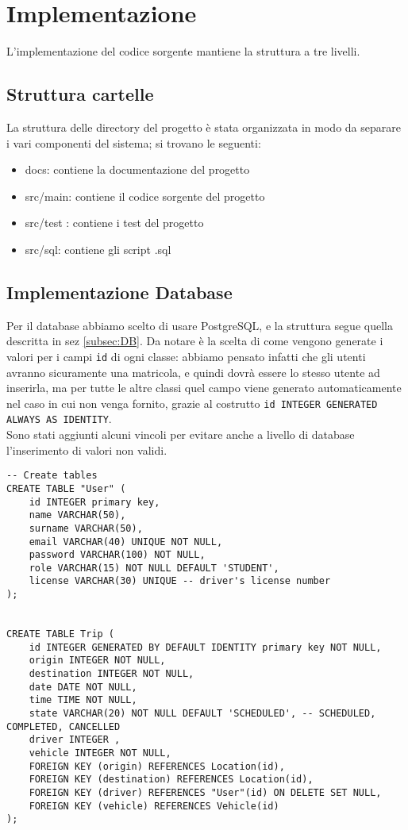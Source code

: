 \section{Implementazione}

L'implementazione del codice sorgente mantiene la struttura a tre livelli.
\subsection{Struttura cartelle}
La struttura delle directory del progetto è stata organizzata in modo da separare i vari componenti del sistema; si trovano le seguenti:
\begin{itemize}
    \item docs: contiene la documentazione del progetto
    \item src/main: contiene il codice sorgente del progetto
    \item src/test : contiene i test del progetto
    \item src/sql: contiene gli script .sql
\end{itemize}

\subsection{Implementazione Database}\label{subsec:DBimpl}
Per il database abbiamo scelto di usare PostgreSQL, e la struttura segue quella descritta in sez \ref{subsec:DB}.
Da notare è la scelta di come vengono generate i valori per i campi \texttt{id} di ogni classe: abbiamo pensato infatti che gli utenti avranno sicuramente una matricola, e quindi dovrà essere lo stesso utente ad inserirla, ma per tutte le altre classi quel campo viene generato automaticamente nel caso in cui non venga fornito, grazie al costrutto \texttt{id INTEGER GENERATED ALWAYS AS IDENTITY}.\\
Sono stati aggiunti alcuni vincoli per evitare anche a livello di database l'inserimento di valori non validi.

\begin{lstlisting}[style=sql, caption={Esempio creazione tabelle User e Trip}]
-- Create tables
CREATE TABLE "User" (
    id INTEGER primary key, 
    name VARCHAR(50),
    surname VARCHAR(50),
    email VARCHAR(40) UNIQUE NOT NULL,
    password VARCHAR(100) NOT NULL, 
    role VARCHAR(15) NOT NULL DEFAULT 'STUDENT',
    license VARCHAR(30) UNIQUE -- driver's license number
);


CREATE TABLE Trip (
    id INTEGER GENERATED BY DEFAULT IDENTITY primary key NOT NULL,
    origin INTEGER NOT NULL,
    destination INTEGER NOT NULL,
    date DATE NOT NULL,
    time TIME NOT NULL,
    state VARCHAR(20) NOT NULL DEFAULT 'SCHEDULED', -- SCHEDULED, COMPLETED, CANCELLED
    driver INTEGER , 
    vehicle INTEGER NOT NULL,
    FOREIGN KEY (origin) REFERENCES Location(id),
    FOREIGN KEY (destination) REFERENCES Location(id),
    FOREIGN KEY (driver) REFERENCES "User"(id) ON DELETE SET NULL,
    FOREIGN KEY (vehicle) REFERENCES Vehicle(id)
);
\end{lstlisting}
